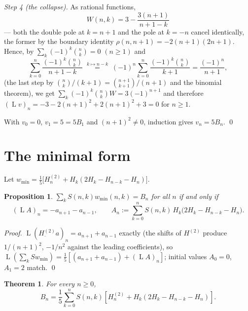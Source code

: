 \documentclass[11pt]{article}
\newtheorem{theorem}{Theorem}
\newtheorem{proposition}{Proposition}
\theoremstyle{remark}
\DeclareMathOperator{\Lop}{L}
\begin{document}
\emph{Step 4 (the collapse).} As rational functions,
\[
\boxed{\;W(n,k)=3-\frac{3(n+1)}{n+1-k}\;}
\]
— both the double pole at $k=n+1$ and the pole at $k=-n$ cancel identically,
the former by the boundary identity $\rho(n,n+1)=-2(n+1)(2n+1)$. Hence, by
$\sum_k(-1)^{k}\binom nk=0$ $(n\ge1)$ and
\[
\sum_{k=0}^{n}\frac{(-1)^{k}\binom nk}{n+1-k}
\;\overset{k\mapsto n-k}{=}\;
(-1)^{n}\sum_{k=0}^{n}\frac{(-1)^{k}\binom nk}{k+1}
=\frac{(-1)^{n}}{n+1},
\]
(the last step by $\binom nk/(k+1)=\binom{n+1}{k+1}/(n+1)$ and the binomial
theorem), we get $\sum_k(-1)^{k}\binom nkW=3(-1)^{n+1}$ and therefore
$(\Lop v)_n=-3-2(n+1)^{2}+2(n+1)^{2}+3=0$ for $n\ge1$.

With $v_0=0$, $v_1=5=5B_1$ and $(n+1)^{2}\neq0$, induction gives $v_n=5B_n$. \qed

\section{The minimal form}

Let $w_{\min}=\tfrac15\bigl[H^{(2)}_n+H_k(2H_k-H_{n-k}-H_n)\bigr]$.

\begin{proposition}
$\sum_kS(n,k)w_{\min}(n,k)=B_n$ for all $n$ \emph{if and only if}
\begin{equation}\label{eq:L2}
(\Lop A)_n=-a_{n+1}-a_{n-1},\qquad
A_n:=\sum_{k=0}^{n}S(n,k)\,H_k\bigl(2H_k-H_{n-k}-H_n\bigr).
\end{equation}
\end{proposition}

\begin{proof}
$\Lop(H^{(2)}_\cdot a)_n=a_{n+1}+a_{n-1}$ exactly (the shifts of $H^{(2)}$
produce $1/(n+1)^{2}$, $-1/n^{2}$ against the leading coefficients), so
$\Lop(\sum_kSw_{\min})=\tfrac15[(a_{n+1}+a_{n-1})+(\Lop A)_n]$; initial values
$A_0=0$, $A_1=2$ match. \qed
\end{proof}

\begin{theorem}\label{thm:minimal}
For every $n\geq0$,
\[
 B_n=\frac15\sum_{k=0}^nS(n,k)
 \left[H_n^{(2)}+H_k(2H_k-H_{n-k}-H_n)\right].
\]
\end{theorem}
\end{document}

